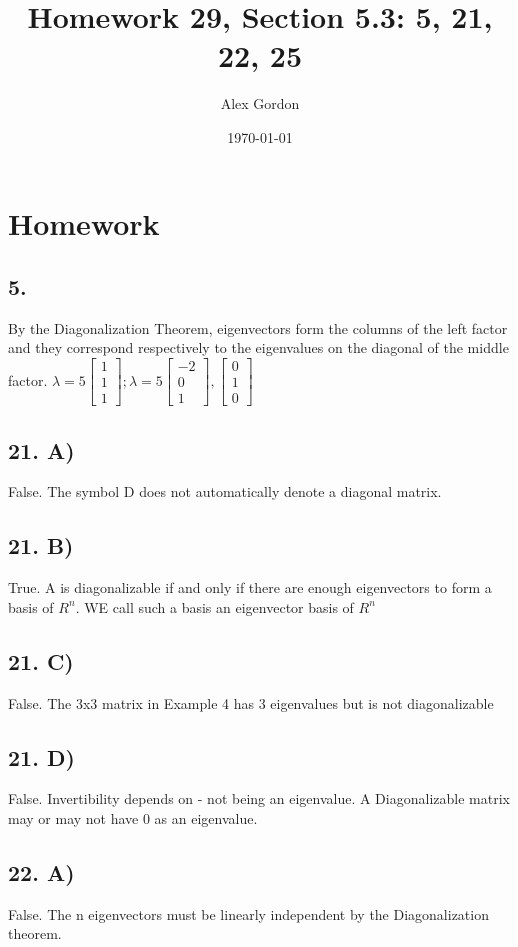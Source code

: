 \documentclass[12]{scrartcl}
\begin{document}
\title{Homework 29, Section 5.3: 5, 21, 22, 25}
\author{Alex Gordon}
\date{\today}
\maketitle
\section*{Homework}
\subsection*{5.}
By the Diagonalization Theorem, eigenvectors form the columns of the left factor and they correspond respectively to the eigenvalues on the diagonal of the middle factor. 
$\lambda = 5 \begin{bmatrix}  1 \\1 \\ 1  \end{bmatrix}; \lambda = 5 \begin{bmatrix}  -2 \\0 \\ 1  \end{bmatrix}, \begin{bmatrix}  0 \\1 \\ 0  \end{bmatrix}$
\subsection*{21. A)}
False. The symbol D does not automatically denote a diagonal matrix. 
\subsection*{21. B)}
True. A is diagonalizable if and only if there are enough eigenvectors to form a basis of $R^n$. WE call such a basis an eigenvector basis of $R^n$
\subsection*{21. C)}
False. The 3x3 matrix in Example 4 has 3 eigenvalues but is not diagonalizable
\subsection*{21. D)}
False. Invertibility depends on - not being an eigenvalue. A Diagonalizable matrix may or may not have 0 as an eigenvalue. 
\subsection*{22. A)}
False. The n eigenvectors must be linearly independent by the Diagonalization theorem. 
\end{document}
